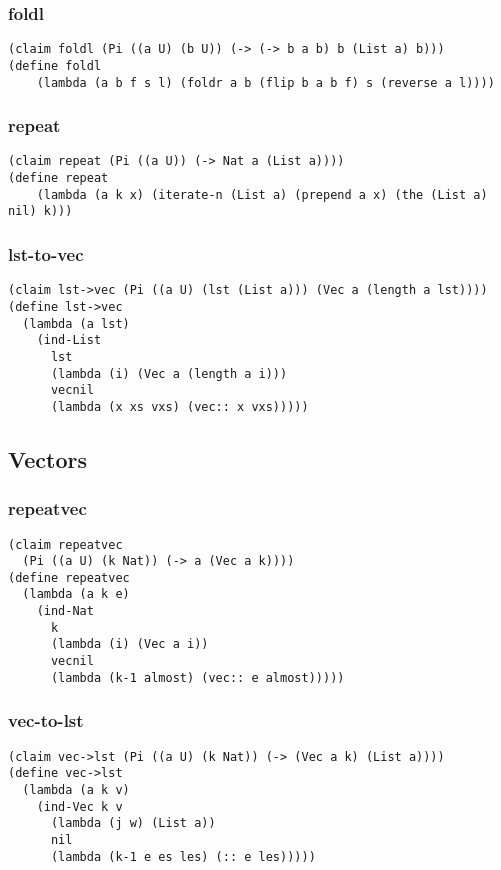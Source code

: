 \subsubsection{foldl} \label{code:foldl}
\begin{verbatim}
(claim foldl (Pi ((a U) (b U)) (-> (-> b a b) b (List a) b)))
(define foldl
    (lambda (a b f s l) (foldr a b (flip b a b f) s (reverse a l))))
\end{verbatim}

\subsubsection{repeat} \label{code:repeat}
\begin{verbatim}
(claim repeat (Pi ((a U)) (-> Nat a (List a))))
(define repeat
    (lambda (a k x) (iterate-n (List a) (prepend a x) (the (List a) nil) k)))
\end{verbatim}


\subsubsection{lst-to-vec} \label{code:lst-to-vec}
\begin{verbatim}
(claim lst->vec (Pi ((a U) (lst (List a))) (Vec a (length a lst))))
(define lst->vec
  (lambda (a lst)
    (ind-List
      lst
      (lambda (i) (Vec a (length a i)))
      vecnil
      (lambda (x xs vxs) (vec:: x vxs)))))
\end{verbatim}

\subsection{Vectors}

\subsubsection{repeatvec} \label{code:repeatvec}
\begin{verbatim}
(claim repeatvec
  (Pi ((a U) (k Nat)) (-> a (Vec a k))))
(define repeatvec
  (lambda (a k e)
    (ind-Nat
      k
      (lambda (i) (Vec a i))
      vecnil
      (lambda (k-1 almost) (vec:: e almost)))))
\end{verbatim}

\subsubsection{vec-to-lst} \label{code:vec-to-lst}
\begin{verbatim}
(claim vec->lst (Pi ((a U) (k Nat)) (-> (Vec a k) (List a))))
(define vec->lst
  (lambda (a k v)
    (ind-Vec k v
      (lambda (j w) (List a))
      nil
      (lambda (k-1 e es les) (:: e les)))))
\end{verbatim}

